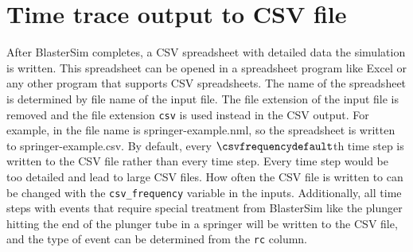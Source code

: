 \section{Time trace output to CSV file}\label{csv}

After BlasterSim completes, a CSV spreadsheet with detailed data the simulation is written.
This spreadsheet can be opened in a spreadsheet program like Excel or any other program that supports CSV spreadsheets.
The name of the spreadsheet is determined by file name of the input file.
The file extension of the input file is removed and the file extension \texttt{csv} is used instead in the CSV output.
For example, in  the file name is springer-example.nml, so the spreadsheet is written to springer-example.csv.
By default, every $\csvfrequencydefault$th time step is written to the CSV file rather than every time step.
Every time step would be too detailed and lead to large CSV files.
How often the CSV file is written to can be changed with the \texttt{csv\_frequency} variable in the inputs.
Additionally, all time steps with events that require special treatment from BlasterSim like the plunger hitting the end of the plunger tube in a springer will be written to the CSV file, and the type of event can be determined from the \texttt{rc} column.

